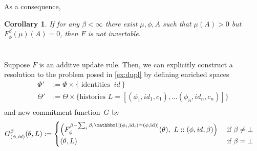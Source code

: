\documentclass{uai2023}
\theoremstyle{plain}
\newtheorem{coro}{Corollary}[theorem]
\theoremstyle{definition}
\newcommand\cofunc{commitment function}
\begin{document}
As a consequence,
\begin{coro}
	If for any $\beta < \infty$ there exist $\mu, \phi, A$ such that
	$\mu(A) > 0$  but $F^{\beta}_\phi(\mu)(A) = 0$, then $F$ is not invertable.
\end{coro}



\section{}
\begin{example}\label{ex:dupl-enriched}
Suppose $F$ is an additve update rule. Then, we can explicitly construct a resolution to the problem posed in \cref{ex:dupl} by defining enriched spaces
\begin{align*}
	\Phi' &:= \Phi \times \Big\{ \text{ identities }~ \mathit{id}~ \Big\}\\
	\Theta' &:= \Theta \times
		\Big\{ \text{histories } L = [(\phi_1, \mathit{id}_1, c_1), \ldots (\phi_n, \mathit{id}_n, c_n)] \Big\} \\
\end{align*}
and new \cofunc\ $G$ by
\begin{align*}
	 G^{\beta}_{(\phi,\mathit{id})}(\theta, L) & :=
		\begin{cases}
		\Big( F^{\beta- \sum_{i}\beta_i \mathbbm1[(\phi_i,\mathrm{id}_i) = (\phi, \mathrm{id})]}_{\phi}(\theta),~
			 L :: (\phi,\mathit{id}, \beta)
		 \Big)
			 &\text{ if } \beta \ne \bot \\
		(\theta, L) &
			   \text{ if } \beta = \bot
	\end{cases}
\end{align*}
\end{example}
 
\end{document}
